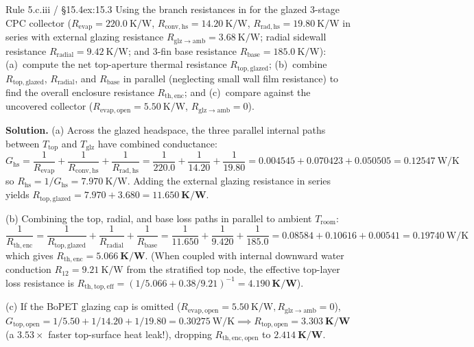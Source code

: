 \begin{workedexample}{Rule 5.c.iii / §15.4}{ex:15.3}
Using the branch resistances in  for the glazed 3-stage CPC collector ($R_{\mathrm{evap}} = \SI{220.0}{\kelvin\per\watt}$, $R_{\mathrm{conv,hs}} = \SI{14.20}{\kelvin\per\watt}$, $R_{\mathrm{rad,hs}} = \SI{19.80}{\kelvin\per\watt}$ in series with external glazing resistance $R_{\mathrm{glz\to amb}} = \SI{3.68}{\kelvin\per\watt}$; radial sidewall resistance $R_{\mathrm{radial}} = \SI{9.42}{\kelvin\per\watt}$; and 3-fin base resistance $R_{\mathrm{base}} = \SI{185.0}{\kelvin\per\watt}$): (a)~compute the net top-aperture thermal resistance $R_{\mathrm{top,glazed}}$; (b)~combine $R_{\mathrm{top,glazed}}$, $R_{\mathrm{radial}}$, and $R_{\mathrm{base}}$ in parallel (neglecting small wall film resistance) to find the overall enclosure resistance $R_{\mathrm{th,enc}}$; and (c)~compare against the uncovered collector ($R_{\mathrm{evap,open}} = \SI{5.50}{\kelvin\per\watt}$, $R_{\mathrm{glz\to amb}} = 0$).

\textbf{Solution.}
(a) Across the glazed headspace, the three parallel internal paths between $T_{\mathrm{top}}$ and $T_{\mathrm{glz}}$ have combined conductance:
\[
  G_{\mathrm{hs}} = \frac{1}{R_{\mathrm{evap}}} + \frac{1}{R_{\mathrm{conv,hs}}} + \frac{1}{R_{\mathrm{rad,hs}}} = \frac{1}{220.0} + \frac{1}{14.20} + \frac{1}{19.80} = 0.004545 + 0.070423 + 0.050505 = \SI{0.12547}{\watt\per\kelvin}
\]
so $R_{\mathrm{hs}} = 1/G_{\mathrm{hs}} = \SI{7.970}{\kelvin\per\watt}$. Adding the external glazing resistance in series yields $R_{\mathrm{top,glazed}} = 7.970 + 3.680 = \mathbf{\SI{11.650}{\kelvin\per\watt}}$.

(b) Combining the top, radial, and base loss paths in parallel to ambient $T_{\mathrm{room}}$:
\[
  \frac{1}{R_{\mathrm{th,enc}}} = \frac{1}{R_{\mathrm{top,glazed}}} + \frac{1}{R_{\mathrm{radial}}} + \frac{1}{R_{\mathrm{base}}} = \frac{1}{11.650} + \frac{1}{9.420} + \frac{1}{185.0} = 0.08584 + 0.10616 + 0.00541 = \SI{0.19740}{\watt\per\kelvin}
\]
which gives $R_{\mathrm{th,enc}} = \mathbf{\SI{5.066}{\kelvin\per\watt}}$. (When coupled with internal downward water conduction $R_{12} = \SI{9.21}{\kelvin\per\watt}$ from the stratified top node, the effective top-layer loss resistance is $R_{\mathrm{th,top,eff}} = (1/5.066 + 0.38/9.21)^{-1} = \mathbf{\SI{4.190}{\kelvin\per\watt}}$).

(c) If the BoPET glazing cap is omitted ($R_{\mathrm{evap,open}} = \SI{5.50}{\kelvin\per\watt}, R_{\mathrm{glz\to amb}}=0$), $G_{\mathrm{top,open}} = 1/5.50 + 1/14.20 + 1/19.80 = \SI{0.30275}{\watt\per\kelvin} \implies R_{\mathrm{top,open}} = \mathbf{\SI{3.303}{\kelvin\per\watt}}$ (a $3.53\times$ faster top-surface heat leak!), dropping $R_{\mathrm{th,enc,open}}$ to $\mathbf{\SI{2.414}{\kelvin\per\watt}}$.
\end{workedexample}

